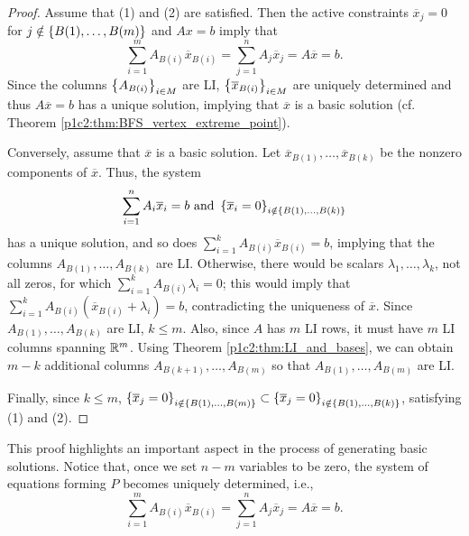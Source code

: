 \begin{proof}
	Assume that (1) and (2) are satisfied. Then the active constraints $\overline{x}_j = 0$ for $j \notin \left\{ B(1), \dots, B(m) \right \}$ and $Ax = b$ imply that
%	
	\begin{equation*}
		\sum_{i=1}^m A_{B(i)}\overline{x}_{B(i)} = \sum_{j=1}^n A_j\overline{x}_j = A\overline{x} = b.
	\end{equation*}
%
	Since the columns $\left\{ A_{B(i)} \right \}_{i \in M}$ are LI, $\left\{ \overline{x}_{B(i)} \right \}_{i \in M}$ are uniquely determined and thus $A\overline{x} = b$ has a unique solution, implying that $\overline{x}$ is a basic solution (cf. Theorem \ref{p1c2:thm:BFS_vertex_extreme_point}).
	
	Conversely, assume that $\overline{x}$ is a basic solution. Let $\overline{x}_{B(1)}, \dots, \overline{x}_{B(k)}$ be the nonzero components of $\overline{x}$. Thus, the system 
%	
		\begin{equation*}
			\sum_{i=1}^n A_i\overline{x}_i = b \text{ and } \left\{ \overline{x}_i = 0 \right \}_{i \notin \left\{ B(1), \dots, B(k) \right \}}
		\end{equation*}
%
	has a unique solution, and so does $\sum_{i=1}^k A_{B(i)}\overline{x}_{B(i)} = b$, implying that the columns $A_{B(1)}, \dots, A_{B(k)}$ are LI. Otherwise, there would be scalars $\lambda_1,\dots, \lambda_k$, not all zeros, for which $\sum_{i=1}^k A_{B(i)}\lambda_i = 0$; this would imply that $\sum_{i=1}^k A_{B(i)}(\overline{x}_{B(i)} + \lambda_i) =b$, contradicting the uniqueness of $\overline{x}$.
	Since $A_{B(1)}, \dots, A_{B(k)}$ are LI, $k \leq m$. Also, since $A$ has $m$ LI rows, it must have $m$ LI columns spanning $\mathbb{R}^m$. Using Theorem \ref{p1c2:thm:LI_and_bases}, we can obtain $m-k$ additional columns $A_{B(k+1)}, \dots, A_{B(m)}$ so that $A_{B(1)}, \dots, A_{B(m)}$ are LI. 
	
	Finally, since $k \leq m $, $\left\{ \overline{x}_j = 0 \right \}_{i \notin \left\{ B(1), \dots, B(m) \right \}} \subset  \left\{ \overline{x}_j = 0 \right \}_{i \notin \left\{ B(1), \dots, B(k) \right \}}$, satisfying (1) and (2). \qedhere 		
\end{proof}	

This proof highlights an important aspect in the process of generating basic solutions. Notice that, once we set $n-m$ variables to be zero, the system of equations forming $P$ becomes uniquely determined, i.e., 
%
\begin{equation*}
	\sum_{i=1}^m A_{B(i)}\overline{x}_{B(i)} = \sum_{j=1}^n A_j\overline{x}_j = A\overline{x} = b.
\end{equation*}	
%


